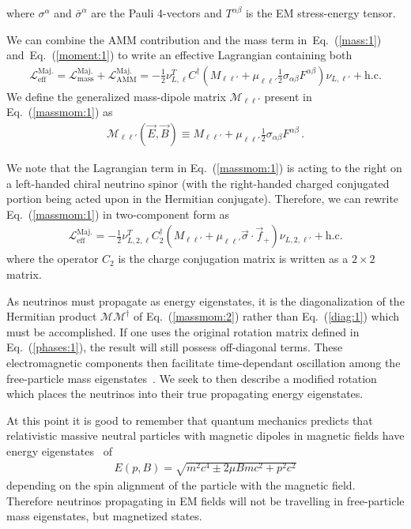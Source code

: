 \documentclass[addchapnum]{ws-rv961x669} %
\newcommand{\req}[1]{Eq.~(\ref{#1})}
\begin{document}
where $\sigma^{\alpha}$ and $\bar\sigma^{\alpha}$ are the Pauli 4-vectors and $T^{\alpha\beta}$ is the EM stress-energy tensor.


We can combine the AMM contribution and the mass term in~\req{mass:1} and~\req{moment:1} to write an effective Lagrangian containing both
\begin{align}
	\label{massmom:1}
    \mathcal{L}_\mathrm{eff}^\mathrm{Maj.} =
    \mathcal{L}_\mathrm{mass}^\mathrm{Maj.} + \mathcal{L}_\mathrm{AMM}^\mathrm{Maj.} = 
    -\frac{1}{2}\nu_{L,\ell}^{T}C^{\dag}\left(M_{\ell\ell'}+\mu_{\ell\ell'}\frac{1}{2}\sigma_{\alpha\beta}F^{\alpha\beta}\right)\nu_{L,\ell'}+\mathrm{h.c.}
\end{align}
We define the generalized mass-dipole matrix $\mathcal{M}_{\ell\ell'}$ present in \req{massmom:1} as
\begin{align}
	\label{massmom:2}
    \mathcal{M}_{\ell\ell'}(\vec{E},\vec{B})\equiv M_{\ell\ell'}+\mu_{\ell\ell'}\frac{1}{2}\sigma_{\alpha\beta}F^{\alpha\beta}\,.
\end{align}


We note that the Lagrangian term in \req{massmom:1} is acting to the right on a left-handed chiral neutrino spinor (with the right-handed charged conjugated portion being acted upon in the Hermitian conjugate). Therefore, we can rewrite \req{massmom:1} in two-component form as
\begin{align}
    \label{massmom:1a}
    \mathcal{L}_\mathrm{eff}^\mathrm{Maj.} = 
    -\frac{1}{2}\nu_{L,2,\ell}^{T}C_{2}^{\dag}\left(M_{\ell\ell'}+\mu_{\ell\ell'}\vec{\sigma}\cdot\vec{f}_{+}\right)\nu_{L,2,\ell'}+\mathrm{h.c.}
\end{align}
where the operator $C_{2}$ is the charge conjugation matrix is written as a $2\times 2$ matrix.

As neutrinos must propagate as energy eigenstates, it is the diagonalization of the Hermitian product $\mathcal{M}\mathcal{M}^{\dag}$ of \req{massmom:2} rather than \req{diag:1} which must be accomplished. If one uses the original rotation matrix defined in \req{phases:1}, the result will still possess off-diagonal terms. These electromagnetic components then facilitate time-dependant oscillation among the free-particle mass eigenstates~\cite{Giunti:2014ixa}. We seek to then describe a modified rotation which places the neutrinos into their true propagating energy eigenstates.

At this point it is good to remember that quantum mechanics predicts that relativistic massive neutral particles with magnetic dipoles in magnetic fields have energy eigenstates~\cite{Steinmetz:2018ryf} of
\begin{align}
    \label{kgp:1}
    E(p,B) = \sqrt{m^{2}c^{4}\pm2\mu Bmc^{2}+p^{2}c^{2}}
\end{align}
depending on the spin alignment of the particle with the magnetic field. Therefore neutrinos propagating in EM fields will not be travelling in free-particle mass eigenstates, but magnetized states.
\end{document}
